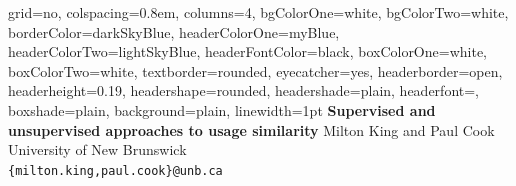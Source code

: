 \documentclass[paperwidth=90cm,paperheight=120cm,final]{baposter}
\begin{document}
\newlength{\leftimgwidth}
\begin{poster}%
  {
  grid=no,
  colspacing=0.8em,
  columns=4,
  bgColorOne=white,
  bgColorTwo=white,
  borderColor=darkSkyBlue,
  headerColorOne=myBlue,
  headerColorTwo=lightSkyBlue,
  headerFontColor=black,
  boxColorOne=white,
  boxColorTwo=white,
  textborder=rounded,
  eyecatcher=yes,
  headerborder=open,
  headerheight=0.19\textheight,
  headershape=rounded,
  headershade=plain,
  headerfont=\Large\textsc, %
  boxshade=plain,
  background=plain,
  linewidth=1pt
  }
  {
\hspace{55mm}
  }
  {
    \textsf{\bfseries Supervised and unsupervised approaches to usage similarity}
  }
{\vspace{3mm}
\sf Milton King and Paul Cook \\
University of New Brunswick\\
  {\tt \{milton.king,paul.cook\}@unb.ca} \vspace*{-2ex}
}
{
 \hspace{5mm}

%
%

}
\end{poster}
\end{document}
